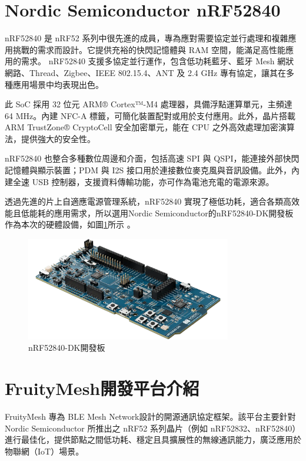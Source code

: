 \begin{ZhChapter}
\section{Nordic Semiconductor nRF52840}
nRF52840 是 nRF52 系列中很先進的成員，專為應對需要協定並行處理和複雜應用挑戰的需求而設計。它提供充裕的快閃記憶體與 RAM 空間，能滿足高性能應用的需求。
nRF52840 支援多協定並行運作，包含低功耗藍牙、藍牙 Mesh 網狀網路、Thread、Zigbee、IEEE 802.15.4、ANT 及 2.4 GHz 專有協定，讓其在多種應用場景中均表現出色。

此 SoC 採用 32 位元 ARM® Cortex™-M4 處理器，具備浮點運算單元，主頻達 64 MHz。內建 NFC-A 標籤，可簡化裝置配對或用於支付應用。此外，晶片搭載 ARM TrustZone® CryptoCell 安全加密單元，能在 CPU 之外高效處理加密演算法，提供強大的安全性。

nRF52840 也整合多種數位周邊和介面，包括高速 SPI 與 QSPI，能連接外部快閃記憶體與顯示裝置；PDM 與 I2S 接口用於連接數位麥克風與音訊設備。此外，內建全速 USB 控制器，支援資料傳輸功能，亦可作為電池充電的電源來源。

透過先進的片上自適應電源管理系統，nRF52840 實現了極低功耗，適合各類高效能且低能耗的應用需求，所以選用Nordic Semiconductor的nRF52840-DK開發板\cite{nordic2023softdevices}作為本次的硬體設備，如圖\ref{fig: nRF52840-DK開發板}所示
。

\begin{figure}[H]
    \centering
    \includegraphics[width = 0.8\textwidth]{image/nRF52840-DK開發板.png}
    \caption{nRF52840-DK開發板}
    \label{fig: nRF52840-DK開發板}
\end{figure}

\section{FruityMesh開發平台介紹}
FruityMesh \cite{fruitymesh2023} 專為 BLE Mesh Network設計的開源通訊協定框架。該平台主要針對 Nordic Semiconductor 所推出之 nRF52 系列晶片（例如 nRF52832、nRF52840）進行最佳化，提供節點之間低功耗、穩定且具擴展性的無線通訊能力，廣泛應用於物聯網（IoT）場景。


\end{ZhChapter}

